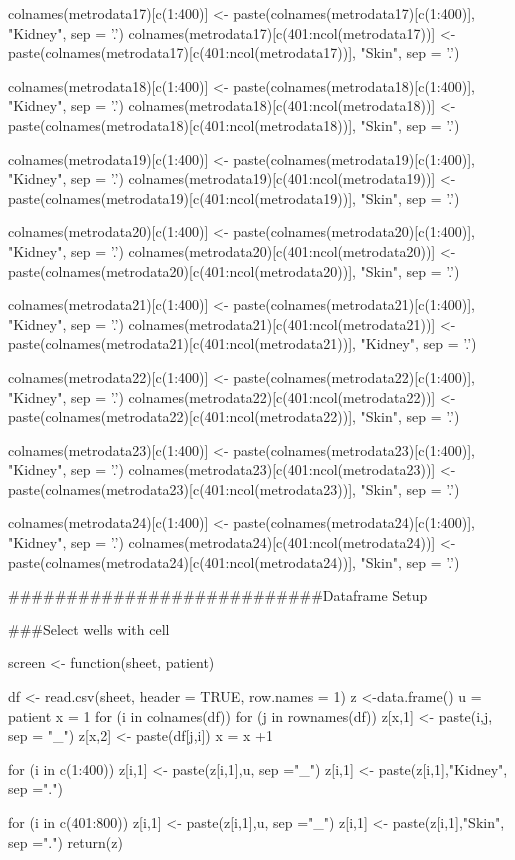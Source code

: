 \documentclass[10pt]{article}
\begin{document}
colnames(metrodata17)[c(1:400)] <- paste(colnames(metrodata17)[c(1:400)], "Kidney", sep = '.')
colnames(metrodata17)[c(401:ncol(metrodata17))] <- paste(colnames(metrodata17)[c(401:ncol(metrodata17))], "Skin", sep = '.')

colnames(metrodata18)[c(1:400)] <- paste(colnames(metrodata18)[c(1:400)], "Kidney", sep = '.')
colnames(metrodata18)[c(401:ncol(metrodata18))] <- paste(colnames(metrodata18)[c(401:ncol(metrodata18))], "Skin", sep = '.')

colnames(metrodata19)[c(1:400)] <- paste(colnames(metrodata19)[c(1:400)], "Kidney", sep = '.')
colnames(metrodata19)[c(401:ncol(metrodata19))] <- paste(colnames(metrodata19)[c(401:ncol(metrodata19))], "Skin", sep = '.')

colnames(metrodata20)[c(1:400)] <- paste(colnames(metrodata20)[c(1:400)], "Kidney", sep = '.')
colnames(metrodata20)[c(401:ncol(metrodata20))] <- paste(colnames(metrodata20)[c(401:ncol(metrodata20))], "Skin", sep = '.')

colnames(metrodata21)[c(1:400)] <- paste(colnames(metrodata21)[c(1:400)], "Kidney", sep = '.')
colnames(metrodata21)[c(401:ncol(metrodata21))] <- paste(colnames(metrodata21)[c(401:ncol(metrodata21))], "Kidney", sep = '.')

colnames(metrodata22)[c(1:400)] <- paste(colnames(metrodata22)[c(1:400)], "Kidney", sep = '.')
colnames(metrodata22)[c(401:ncol(metrodata22))] <- paste(colnames(metrodata22)[c(401:ncol(metrodata22))], "Skin", sep = '.')

colnames(metrodata23)[c(1:400)] <- paste(colnames(metrodata23)[c(1:400)], "Kidney", sep = '.')
colnames(metrodata23)[c(401:ncol(metrodata23))] <- paste(colnames(metrodata23)[c(401:ncol(metrodata23))], "Skin", sep = '.')

colnames(metrodata24)[c(1:400)] <- paste(colnames(metrodata24)[c(1:400)], "Kidney", sep = '.')
colnames(metrodata24)[c(401:ncol(metrodata24))] <- paste(colnames(metrodata24)[c(401:ncol(metrodata24))], "Skin", sep = '.')

###########################Dataframe Setup


###Select wells with cell

screen <- function(sheet, patient) {
  df <- read.csv(sheet, header = TRUE, row.names = 1)
  z <-data.frame()
  u = patient
  x = 1
  for (i in colnames(df)) {
    for (j in rownames(df)) {
      z[x,1] <- paste(i,j, sep = "_")
      z[x,2] <- paste(df[j,i])
      x = x +1
    }
  }
  
  for (i in c(1:400)){
    z[i,1] <- paste(z[i,1],u, sep ="_")
    z[i,1] <- paste(z[i,1],"Kidney", sep =".")
  }
  
  for (i in c(401:800)){
    z[i,1] <- paste(z[i,1],u, sep ="_")
    z[i,1] <- paste(z[i,1],"Skin", sep =".")
  }
  return(z)
}
\end{document}
